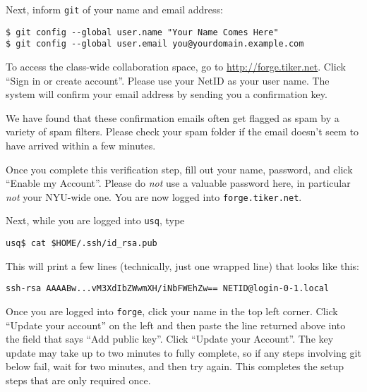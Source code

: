\documentclass[11pt]{article}
\begin{document}
Next, inform \texttt{git} of your name and email address:
\begin{lstlisting}
$ git config --global user.name "Your Name Comes Here"
$ git config --global user.email you@yourdomain.example.com
\end{lstlisting}

To access the class-wide collaboration space, go to
\url{http://forge.tiker.net}. Click ``Sign in or create account''.
Please use your NetID as your user name. The system will confirm your
email address by sending you a confirmation key.  

\begin{note}
We have found that these confirmation emails often get flagged as spam
by a variety of spam filters. Please check your spam folder if the
email doesn't seem to have arrived within a few minutes.
\end{note}

Once you complete this
verification step, fill out your name, password, and click ``Enable my
Account''. Please do \emph{not} use a valuable password here, in
particular \emph{not} your NYU-wide one. You are now logged into
\texttt{forge.tiker.net}.

Next, while you are logged into \texttt{usq}, type
\begin{lstlisting}
usq$ cat $HOME/.ssh/id_rsa.pub
\end{lstlisting}
This will print a few lines (technically, just one wrapped line) that
looks like this:
\begin{lstlisting}
ssh-rsa AAAABw...vM3XdIbZWwmXH/iNbFWEhZw== NETID@login-0-1.local
\end{lstlisting}
Once you are logged into \texttt{forge}, click your name in the top
left corner. Click ``Update your account'' on the left and then paste
the line returned above into the field that says ``Add public key''.
Click ``Update your Account''. The key update may take up to two
minutes to fully complete, so if any steps involving git below fail,
wait for two minutes, and then try again.
This completes the setup steps that are only required once.
\end{document}
